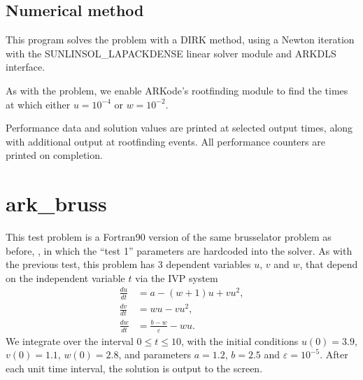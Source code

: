 \documentclass[letterpaper,10pt,english]{sphinxmanual}
\begin{document}
\subsection{Numerical method}
\label{\detokenize{f2003_serial:id5}}
\sphinxAtStartPar
This program solves the problem with a DIRK method, using a Newton
iteration with the SUNLINSOL\_LAPACKDENSE linear solver module and
ARKDLS interface.

\sphinxAtStartPar
As with the {\hyperref[\detokenize{c_serial:ark-robertson-root}]{}} problem, we enable ARKode’s
rootfinding module to find the times at which either \(u=10^{-4}\)
or \(w=10^{-2}\).

\sphinxAtStartPar
Performance data and solution values are printed at
selected output times, along with additional output at rootfinding
events.  All performance counters are printed on completion.


\section{ark\_bruss}
\label{\detokenize{f2003_serial:ark-bruss}}\label{\detokenize{f2003_serial:id6}}
\sphinxAtStartPar
This test problem is a Fortran\sphinxhyphen{}90 version of the same brusselator
problem as before, {\hyperref[\detokenize{c_serial:ark-brusselator}]{}}, in which the “test 1”
parameters are hard\sphinxhyphen{}coded into the solver.  As with the previous test,
this problem has 3 dependent variables \(u\), \(v\) and
\(w\), that depend on the independent variable \(t\) via the
IVP system
\begin{equation*}
\begin{split}\frac{du}{dt} &= a - (w+1)u + v u^2, \\
\frac{dv}{dt} &= w u - v u^2, \\
\frac{dw}{dt} &= \frac{b-w}{\varepsilon} - w u.\end{split}
\end{equation*}
\sphinxAtStartPar
We integrate over the interval \(0 \le t \le 10\), with the
initial conditions \(u(0) = 3.9\), \(v(0) = 1.1\),
\(w(0) = 2.8\), and parameters \(a=1.2\), \(b=2.5\) and
\(\varepsilon=10^{-5}\).  After each unit time interval, the
solution is output to the screen.
\end{document}
